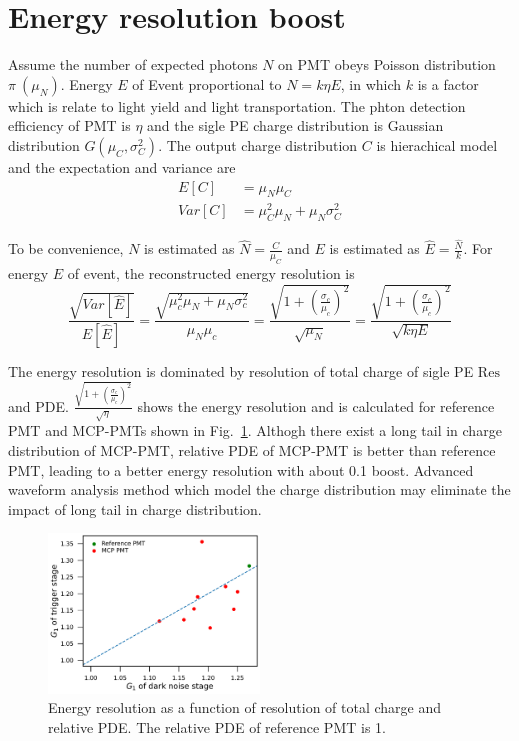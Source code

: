 \section{Energy resolution boost}
\label{Result}

Assume the number of expected photons $N$ on PMT obeys Poisson distribution $\pi~(\mu_N)$. Energy $E$ of Event proportional to $N=k\eta E$, in which $k$ is a factor which is relate to light yield and light transportation. The phton detection efficiency of PMT is $\eta$ and the sigle PE charge distribution is Gaussian distribution $G(\mu_C,\sigma_C^2)$. The output charge distribution $C$ is hierachical model and the expectation and variance are
\begin{align}
    E[C]&=\mu_N\mu_C\\
    Var[C]&=\mu_C^2\mu_N+\mu_N\sigma_C^2
\end{align}

To be convenience, $N$ is estimated as $\hat{N}=\frac{C}{\mu_C}$ and $E$ is estimated as $\hat{E}=\frac{\hat{N}}{k}$. For  energy $E$ of event, the reconstructed energy resolution is 
\begin{equation}
    \frac{\sqrt{Var[\hat{E}]}}{E[\hat{E}]}=\frac{\sqrt{\mu_c^2\mu_N+\mu_N\sigma_c^2}}{\mu_N\mu_c}=\frac{\sqrt{1+(\frac{\sigma_c}{\mu_c})^2}}{\sqrt{\mu_N}}=\frac{\sqrt{1+(\frac{\sigma_c}{\mu_c})^2}}{\sqrt{k\eta E}}
\end{equation}

The energy resolution is dominated by resolution of total charge of sigle PE $\mathrm{Res}$ and PDE. $\frac{\sqrt{1+(\frac{\sigma_c}{\mu_c})^2}}{\sqrt{\eta}}$ shows the energy resolution and is calculated for reference PMT and MCP-PMTs shown in Fig.~\ref{fig:EnergyResolution}. Althogh there exist a long tail in charge distribution of MCP-PMT, relative PDE of MCP-PMT is better than reference PMT, leading to a better energy resolution with about 0.1 boost. Advanced waveform analysis method which model the charge distribution may eliminate the impact of long tail in charge distribution.
\begin{figure}[!htbp]
    \centering
    \includegraphics[width=0.5\textwidth,page=14]{figures/result/compare.pdf}
    \caption{Energy resolution as a function of resolution of total charge and relative PDE. The relative PDE of reference PMT is 1.}
    \label{fig:EnergyResolution}
\end{figure}